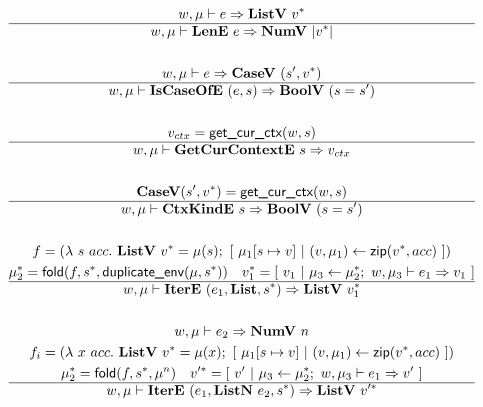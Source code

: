 \begin{gather*}
  w, \mu \vdash e \Rightarrow \listv ~ \seq{v} \\
  \hline
  w, \mu \vdash \lene ~ e \Rightarrow \numv ~ |\seq v| \\
%
\newline \\
  w, \mu \vdash e \Rightarrow \casev ~ (s', \seq{v}) \\
  \hline
  w, \mu \vdash \iscaseofe ~ (e, s) \Rightarrow \boolv ~ (s = s') \\
%
\newline \\
  v_{ctx} = \getcurctx(w, s) \\
  \hline
  w, \mu \vdash \getcurctxe ~ s \Rightarrow v_{ctx} \\
%
\newline \\
  \casev (s', \seq v) = \getcurctx(w, s) \\
  \hline
  w, \mu \vdash \ctxkinde ~ s \Rightarrow \boolv ~ (s = s') \\
%
\newline \\
  f =
    (\lambda ~ s ~ acc. ~
      \listv ~ \seq v = \mu(s); ~
      [ ~ \mu_1[s \mapsto v] ~ | ~ (v, \mu_1) \leftarrow \zip (\seq v, acc) ~ ]
    )
  \\
  \seq{\mu_2} = \fold(f, \seq{s}, \duplicateenv(\mu, \seq{s})) \quad
  \seq{v_1} =
    [ ~
      v_1
    ~ | ~
      \mu_3 \leftarrow \seq {\mu_2}; ~ w, \mu_3 \vdash e_1 \Rightarrow v_1
    ~ ] \\
  \hline
  w, \mu \vdash \itere ~ (e_1, \listiter, \seq{s}) \Rightarrow \listv ~ \seq{v_1} \\
%
\newline \\
  w, \mu \vdash e_2 \Rightarrow \numv ~ n \\
  f_i =
    (\lambda ~ x ~ acc. ~
      \listv ~ \seq v = \mu(x); ~
      [ ~ \mu_1[s \mapsto v] ~ | ~ (v, \mu_1) \leftarrow \zip (\seq v, acc) ~ ]
    )
  \\
  \seq{\mu_2} = \fold(f, \seq{s}, \mu^n) \quad
  \seq{v'} =
    [ ~
      v'
    ~ | ~
      \mu_3 \leftarrow \seq {\mu_2}; ~ w, \mu_3 \vdash e_1 \Rightarrow v'
    ~ ] \\
  \hline
  w, \mu \vdash \itere ~ (e_1, \listniter ~ e_2, \seq{s}) \Rightarrow \listv ~ \seq{v'} \\
%
\newline \\

\end{gather*}

